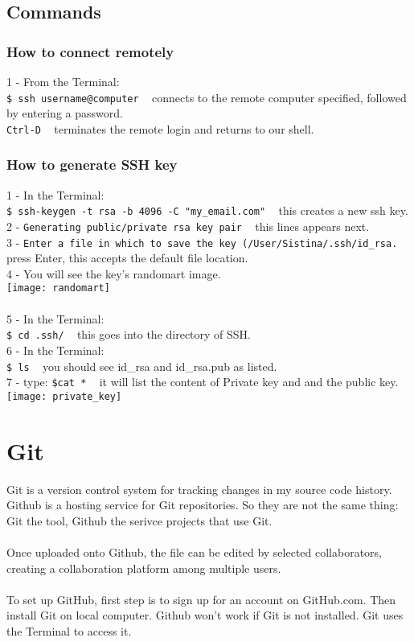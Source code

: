 \documentclass{article}
\begin{document}
{{\subsection{Commands}
\subsubsection{How to connect remotely}
1 - From the Terminal:\\
\texttt{\$ ssh username@computer} ~ connects to the remote computer specified, followed by entering a password.\\
\texttt{Ctrl-D} ~ terminates the remote login and returns to our shell. \\
\subsubsection{How to generate SSH key}
1 - In the Terminal:\\
\texttt{\$ ssh-keygen -t rsa -b 4096 -C "my\_email\@address.com"} ~ this creates a new ssh key.\\
2 - \texttt{Generating public/private rsa key pair} ~ this lines appears next. \\
3 - \texttt{Enter a file in which to save the key (/User/Sistina/.ssh/id\_rsa.} ~ press Enter, this accepts the default file location.\\
4 - You will see the key's randomart image. \\
\texttt{[image: randomart]}\\
\\
5 - In the Terminal:\\
\texttt{\$ cd .ssh/} ~ this goes into the directory of SSH.\\
6 - In the Terminal: \\
\texttt{\$ ls} ~ you should see id\_rsa and id\_rsa.pub as listed.\\
7 - type:
\texttt{\$cat *} ~ it will list the content of Private key and and the public key.\\ 
\texttt{[image: private\_key]}\\


\newpage
\section{Git}
Git is a version control system for tracking changes in my source code history. Github is a hosting service for Git repositories. So they are not the same thing: Git the tool, Github the serivce projects that use Git. \\
\\
Once uploaded onto Github, the file can be edited by selected collaborators, creating a collaboration platform among multiple users. \\
\\
To set up GitHub, first step is to sign up for an account on GitHub.com. Then install Git on local computer. Github won't work if Git is not installed. Git uses the Terminal to access it. 

}}
\end{document}
